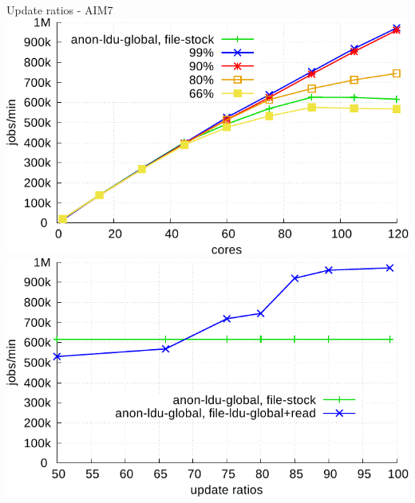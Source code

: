 \documentclass[english]{beamer} %
\begin{document}
\begin{frame}{Update ratios - AIM7}
\includegraphics[scale=0.4]{graph/ratio_aim7_core}
\includegraphics[scale=0.4]{graph/ratio_aim7}
\end{frame}
\end{document}
